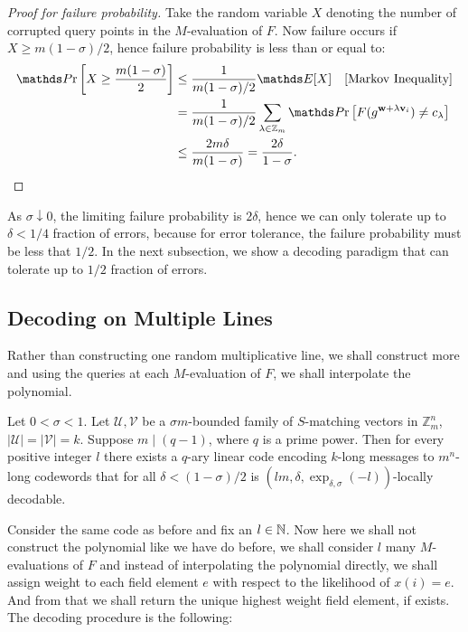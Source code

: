 \begin{proof}[Proof for failure probability]
    Take the random variable $X$ denoting the number of corrupted query points in the $M$-evaluation of $F$. Now failure occurs if $X\geq m(1-\sigma)/2$, hence failure probability is less than or equal to:
    \begin{align*}
        \Pr\left[X \geq \frac{m(1-\sigma)}{2}\right]
        & \leq \frac{1}{m(1-\sigma)/2}\E[X] \quad \text{[Markov Inequality]}\\
        & = \frac{1}{m(1-\sigma)/2}\sum_{\lambda\in\bbz_m}\Pr\left[F(g^{\bfw + \lambda\bfv_i})\neq c_{\lambda}\right]\\
        & \leq \frac{2m\delta}{m(1-\sigma)} = \frac{2\delta}{1-\sigma}.
    \end{align*}
\end{proof}

\begin{observation}
        As $\sigma\downarrow0$, the limiting failure probability is $2\delta$, hence we can only tolerate up to $\delta<1/4$ fraction of errors, because for error tolerance, the failure probability must be less that $1/2$. In the next subsection, we show a decoding paradigm that can tolerate up to $1/2$ fraction of errors.
    \end{observation}

\subsection{Decoding on Multiple Lines}

Rather than constructing one random multiplicative line, we shall construct more and using the queries at each $M$-evaluation of $F$, we shall interpolate the polynomial.

\begin{greybox}
    \begin{proposition}
Let $0 < \sigma < 1$. Let $\mathcal{U},\mathcal{V}$ be a $\sigma m$-bounded family of $S$-matching vectors in $\mathbb{Z}_m^n$, $|\mathcal{U}| = |\mathcal{V}| = k$. Suppose $m \mid (q-1)$, where $q$ is a prime power. Then for every positive integer $l$ there exists a $q$-ary linear code encoding $k$-long messages to $m^n$-long codewords that for all $\delta < (1-\sigma)/2$ is $(lm,\delta,\exp_{\delta,\sigma}(-l))$-locally decodable.
\end{proposition}
\end{greybox}

Consider the same code as before and fix an $l\in\mathbb{N}$. Now here we shall not construct the polynomial like we have do before, we shall consider $l$ many $M$-evaluations of $F$ and instead of interpolating the polynomial directly, we shall assign weight to each field element $e$ with respect to the likelihood of $x(i) = e$. And from that we shall return the unique highest weight field element, if exists. The decoding procedure is the following:

